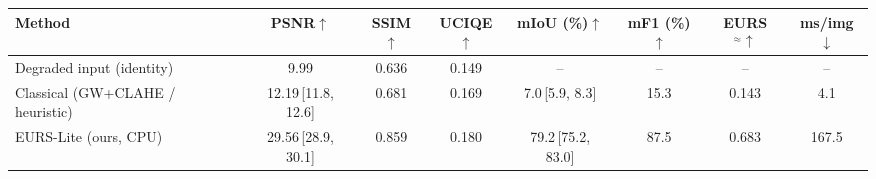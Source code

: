 \begin{tabular}{lccccccc}
\toprule
Method & PSNR$\uparrow$ & SSIM$\uparrow$ & UCIQE$\uparrow$ & mIoU (\%)$\uparrow$ & mF1 (\%)$\uparrow$ & EURS$^{\approx}\uparrow$ & ms/img$\downarrow$ \\
\midrule
Degraded input (identity) & 9.99 & 0.636 & 0.149 & -- & -- & -- & -- \\
Classical (GW+CLAHE / heuristic) & 12.19\,{\scriptsize[11.8, 12.6]} & 0.681 & 0.169 & 7.0\,{\scriptsize[5.9, 8.3]} & 15.3 & 0.143 & 4.1 \\
EURS-Lite (ours, CPU) & 29.56\,{\scriptsize[28.9, 30.1]} & 0.859 & 0.180 & 79.2\,{\scriptsize[75.2, 83.0]} & 87.5 & 0.683 & 167.5 \\
\bottomrule
\end{tabular}
